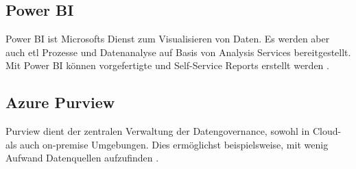 \subsection{Power BI} \label{sec:grundlagen:azure_dienste:powerBI}
Power BI ist Microsofts Dienst zum Visualisieren von Daten. Es werden aber auch \ac{etl} Prozesse und Datenanalyse auf Basis von Analysis Services bereitgestellt. Mit Power BI können vorgefertigte und Self-Service Reports erstellt werden \cite{how_beyond_2020}.

\subsection{Azure Purview} \label{sec:grundlagen:azure_dienste:purview}
Purview dient der zentralen Verwaltung der Datengovernance, sowohl in Cloud- als auch on-premise Umgebungen. Dies ermöglichst beispielsweise, mit wenig Aufwand Datenquellen aufzufinden \cite{lesteve_definitive_2021}.